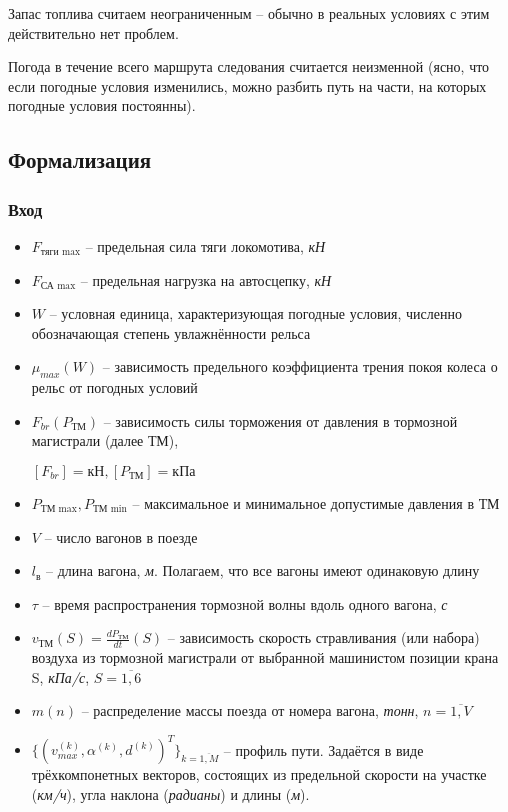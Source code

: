Запас топлива считаем неограниченным -- обычно в реальных условиях с этим действительно нет проблем.

Погода в течение всего маршрута следования считается неизменной (ясно, что если погодные условия изменились, можно разбить путь на части, на которых погодные условия постоянны).

\subsection{Формализация}
\subsubsection{Вход}
\begin{itemize}
\item $F_{\text{тяги max}}$ -- предельная сила тяги локомотива, \textit{кН}
\item $F_{\text{СА max}}$ -- предельная нагрузка на автосцепку, \textit{кН}
\item $W$ -- условная единица, характеризующая погодные условия, численно обозначающая степень увлажнённости рельса
\item $\mu_{max}(W)$ -- зависимость предельного коэффициента трения покоя колеса о рельс от погодных условий
\item $F_{br}(P_{\text{ТМ}})$ -- зависимость силы торможения от давления в тормозной магистрали (далее ТМ),

$[F_{br}]=\text{кН}, [P_{\text{ТМ}}]=\text{кПа}$
\item $P_{\text{ТМ max}}, P_{\text{ТМ min}}$ -- максимальное и минимальное допустимые давления в ТМ
\item $V$ -- число вагонов в поезде
\item $l_{\text{в}}$ -- длина вагона, \textit{м}. Полагаем, что все вагоны имеют одинаковую длину
\item $\tau$ -- время распространения тормозной волны вдоль одного вагона,  \textit{с}
\item $v_{\text{ТМ}}(S)=\frac{dP_{ТМ}}{dt}(S)$ -- зависимость скорость стравливания (или набора) воздуха из тормозной магистрали от выбранной машинистом позиции крана S, \textit{кПа/с}, $S=\overline{1,6}$
\item $m(n)$ -- распределение массы поезда от номера вагона, \textit{тонн}, $n=\overline{1, V}$
\item
$\{(v_{max}^{(k)}, \alpha^{(k)}, d^{(k)})^{T}\}_{k=\overline{1, M}}$ -- профиль пути. Задаётся в виде трёхкомпонетных векторов, состоящих из предельной скорости на участке (\textit{км/ч}), угла наклона (\textit{радианы}) и длины (\textit{м}).

\end{itemize}

